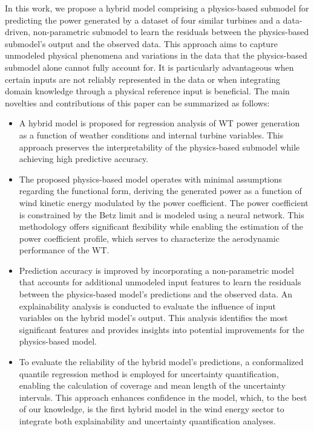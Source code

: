 In this work, we propose a hybrid model comprising a physics-based submodel for predicting the power generated by a dataset of four similar turbines and a data-driven, non-parametric submodel to learn the residuals between the physics-based submodel's output and the observed data. This approach aims to capture unmodeled physical phenomena and variations in the data that the physics-based submodel alone cannot fully account for. It is particularly advantageous when certain inputs are not reliably represented in the data or when integrating domain knowledge through a physical reference input is beneficial.
The main novelties and contributions of this paper can be summarized as follows:
\begin{itemize}
    \item A hybrid model is proposed for regression analysis of WT power generation as a function of weather conditions and internal turbine variables. This approach preserves the interpretability of the physics-based submodel while achieving high predictive accuracy.
    \item The proposed physics-based model operates with minimal assumptions regarding the functional form, deriving the generated power as a function of wind kinetic energy modulated by the power coefficient. The power coefficient is constrained by the Betz limit and is modeled using a neural network. This methodology offers significant flexibility while enabling the estimation of the power coefficient profile, which serves to characterize the aerodynamic performance of the WT.
    \item Prediction accuracy is improved by incorporating a non-parametric model that accounts for additional unmodeled input features to learn the residuals between the physics-based model's predictions and the observed data. An explainability analysis is conducted to evaluate the influence of input variables on the hybrid model's output. This analysis identifies the most significant features and provides insights into potential improvements for the physics-based model.
    \item To evaluate the reliability of the hybrid model's predictions, a conformalized quantile regression method is employed for uncertainty quantification, enabling the calculation of coverage and mean length of the uncertainty intervals. This approach enhances confidence in the model, which, to the best of our knowledge, is the first hybrid model in the wind energy sector to integrate both explainability and uncertainty quantification analyses.
    
\end{itemize}
